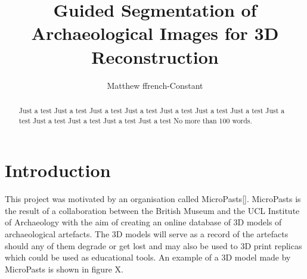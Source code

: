 \documentclass[12pt]{IIBproject}
\begin{document}
\author{Matthew ffrench-Constant}
\title{Guided Segmentation of Archaeological Images for
3D Reconstruction}
\maketitle
\thispagestyle{empty}



\begin{abstract}
Just a test Just a test Just a test Just a test Just a test Just a test 
Just a test Just a test Just a test Just a test Just a test Just a test 
No more than 100 words.
\end{abstract}
\pagestyle{plain}
\tableofcontents
\newpage














\section{Introduction}

This project was motivated by an organisation called MicroPasts[]. MicroPasts is the result of a collaboration between the British Museum and the UCL Institute of Archaeology with the aim of creating an online database of 3D models of archaeological artefacts. The 3D models will serve as a record of the artefacts should any of them degrade or get lost and may also be used to 3D print replicas which could be used as educational tools. An example of a 3D model made by MicroPasts is shown in figure X.
\end{document}
